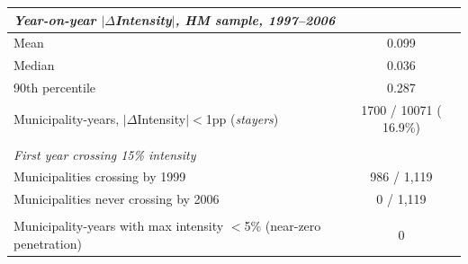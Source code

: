 \begin{tabular}{lc} \hline \hline
\multicolumn{2}{l}{\textit{Year-on-year $|\Delta$Intensity$|$, HM sample, 1997--2006}} \\ \toprule
Mean &  0.099 \\ 
Median &  0.036 \\ 
90th percentile &  0.287 \\ 
Municipality-years, $|\Delta$Intensity$|<$1pp (\textit{stayers}) & 1700 / 10071 ( 16.9\%) \\ 
  & \\ 
\multicolumn{2}{l}{\textit{First year crossing 15\% intensity}} \\ 
Municipalities crossing by 1999 & 986 / 1,119 \\ 
Municipalities never crossing by 2006 & 0 / 1,119 \\ 
  & \\ 
Municipality-years with max intensity $<$5\% (near-zero penetration) & 0 \\ 
\bottomrule
\end{tabular}
